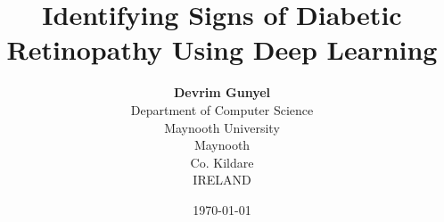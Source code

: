 \documentclass[a4paper,12pt]{report}
\begin{document}
\author{\textbf{Devrim Gunyel}\\[1ex]
  Department of Computer Science\\
  Maynooth University\\
  Maynooth\\
  Co. Kildare\\
  IRELAND}
\date{\today}
\title{Identifying Signs of Diabetic Retinopathy Using Deep Learning}
\maketitle







\tableofcontents

\newpage







\cleardoublepage
\end{document}
